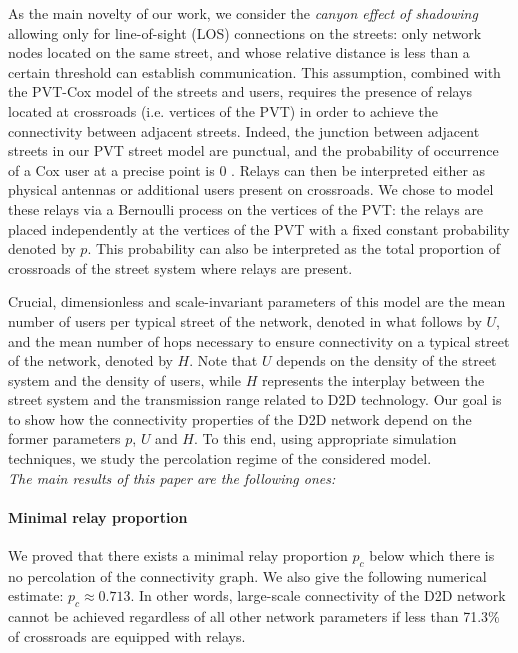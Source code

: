 \documentclass[conference]{IEEEtran}
\begin{document}
As the main novelty of our work, we consider  the {\em canyon effect
  of shadowing}  allowing  only for  line-of-sight (LOS) connections
on the streets: only network nodes located on
the  same street, and whose relative distance is less than a certain
threshold can establish communication.
This assumption, combined
with the PVT-Cox  model of the streets and users, requires the presence of relays located
at crossroads (i.e. vertices of the PVT) in order to achieve the connectivity between adjacent
streets. Indeed, the junction between adjacent streets in our PVT street model are punctual, and the probability of occurrence of a Cox user at a precise point is 0 \cite[Section 5.2]{chiu_stochastic_2013}. Relays can then be interpreted either as physical antennas or additional users present on crossroads.
We chose to model these relays via a Bernoulli process \cite[Section 2.2]{chiu_stochastic_2013}
on the vertices of the PVT: the relays are placed independently at 
the vertices  of the PVT with a fixed constant probability denoted
by $p$. This probability can also be interpreted as the total proportion of crossroads of the street system where relays are present. 

Crucial,
dimensionless and scale-invariant parameters of this model are the mean number of users per
typical street of the network,  denoted in what follows by $U$, 
and the mean number of hops necessary to
ensure connectivity on a typical street of the network, denoted
by $H$. Note that $U$ depends on the density of the street system and the density of users,
while $H$ represents the interplay between the street system 
and the transmission range related to D2D technology. Our goal is to show how  the  connectivity properties of the D2D network
depend on the former parameters $p$, $U$ and $H$.
To this end, using appropriate simulation techniques,  we study  the  percolation regime of the considered
model. \\

\emph{The main results of this paper are the following ones:}

\paragraph{Minimal relay proportion} We proved that there exists a minimal relay proportion $p_c$ below which there
  is no percolation of the connectivity graph. We also give the following numerical estimate: $p_c \approx 0.713$. In other words, large-scale
  connectivity of the D2D network cannot be achieved regardless of all
  other network parameters if
less than 71.3\% of crossroads are equipped with relays.
\\
\end{document}
